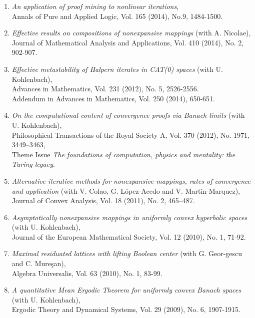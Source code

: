 \documentclass[12pt]{article}
\begin{document}
\begin{enumerate}
\item {\em An application of proof mining to nonlinear iterations},\\
Annals of Pure and Applied Logic, Vol. 165 (2014), No.9, 1484-1500.

\item {\em Effective results on compositions of nonexpansive mappings}  (with A. Nicolae),\\
Journal of Mathematical Analysis and Applications, Vol. 410 (2014), No. 2, 902-907.

\item  {\em Effective metastability of Halpern iterates in CAT(0) spaces} (with U. Kohlenbach), \\
Advances in Mathematics, Vol. 231 (2012), No. 5, 2526-2556.\\
 Addendum in Advances in Mathematics, Vol. 250 (2014), 650-651. 

\item {\em On the computational content of convergence proofs via Banach limits} (with U. Kohlenbach),\\
Philosophical Transactions of the Royal Society A, Vol. 370 (2012), No. 1971, 3449--3463, \\
Theme Issue {\em The foundations of computation, physics and mentality: the Turing legacy}.

\item {\em Alternative iterative methods for nonexpansive mappings, rates of convergence and application} 
(with V. Colao, G. L\'opez-Acedo and V. Martin-Marquez), \\
Journal of Convex Analysis, Vol. 18 (2011), No. 2, 465--487.

\item\label{as-ne}
 {\em Asymptotically nonexpansive mappings in uniformly convex hyperbolic 
spaces} (with U. Kohlenbach), \\
Journal of the European Mathematical Society, Vol. 12 (2010), No. 1, 71-92.

\item {\em Maximal residuated lattices with lifting Boolean center } 
(with G. Geor-gescu and C. Mure\c san),\\
Algebra Universalis, Vol. 63 (2010), No. 1, 83-99.

\item  {\em A quantitative Mean Ergodic Theorem for uniformly convex Banach spaces} (with U. Kohlenbach),\\
 Ergodic Theory and Dynamical Systems, Vol. 29 (2009), No. 6, 1907-1915.


\end{enumerate}
\end{document}
